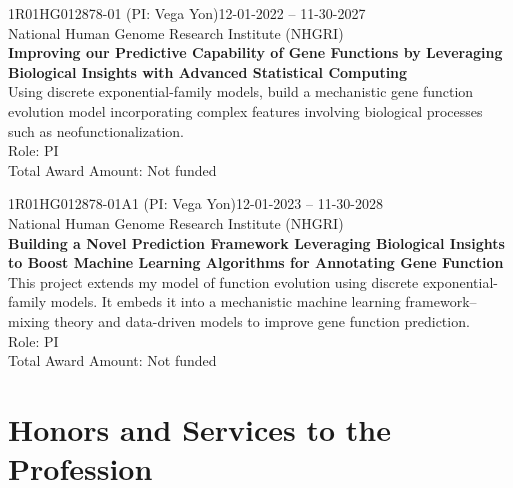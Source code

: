 \documentclass[letterpaper, 10pt]{article}
\renewcommand{\textbf}[1]{{\bfseries\color{teal}#1}}
\begin{document}
\noindent 1R01HG012878-01 (PI: Vega Yon)\hfill 12-01-2022 -- 11-30-2027\\
National Human Genome Research Institute (NHGRI)\\
\textbf{Improving our Predictive Capability of Gene Functions by Leveraging Biological Insights with Advanced Statistical Computing}\\
Using discrete exponential-family models, build a mechanistic gene function evolution model incorporating complex features involving biological processes such as neofunctionalization.\\
Role: PI\\
Total Award Amount: Not funded \vspace{.5cm}

\noindent 1R01HG012878-01A1	(PI: Vega Yon)\hfill 12-01-2023 -- 11-30-2028\\
National Human Genome Research Institute (NHGRI)\\
\textbf{Building a Novel Prediction Framework Leveraging Biological Insights to Boost Machine Learning Algorithms for Annotating Gene Function} \\
This project extends my model of function evolution using discrete exponential-family models. It embeds it into a mechanistic machine learning framework--mixing theory and data-driven models to improve gene function prediction.\\
Role: PI\\
Total Award Amount: Not funded \vspace{.5cm}



% 
% 

\section*{Honors and Services to the Profession}

\end{document}
